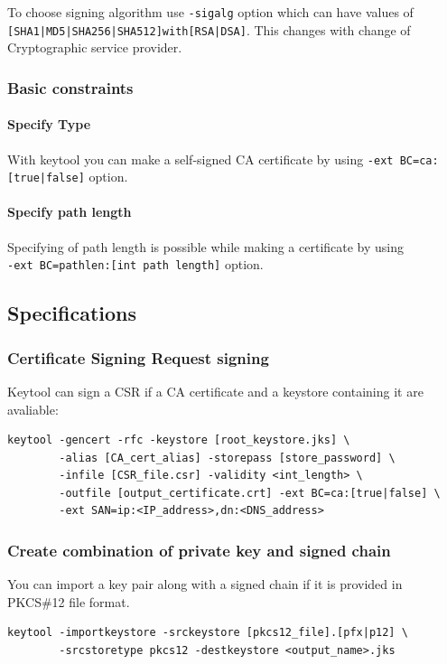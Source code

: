 \documentclass[10pt, a4paper]{report}
\begin{document}
{To choose signing algorithm use \verb+-sigalg+ option which can have values of \verb+[SHA1|MD5|SHA256|SHA512]with[RSA|DSA]+. This changes with change of Cryptographic service provider.
    \subsubsection{Basic constraints}
    
      \paragraph{Specify Type}
With keytool you can make a self-signed CA certificate by using \verb+-ext BC=ca:[true|false]+ option.

      \paragraph{Specify path length}
Specifying of path length is possible while making a certificate by using  \\
\verb+-ext BC=pathlen:[int path length]+ option.

  \subsection{Specifications}
  
    \subsubsection{Certificate Signing Request signing}
Keytool can sign a CSR if a CA certificate and a keystore containing it are avaliable:
\begin{verbatim}
keytool -gencert -rfc -keystore [root_keystore.jks] \
        -alias [CA_cert_alias] -storepass [store_password] \
        -infile [CSR_file.csr] -validity <int_length> \
        -outfile [output_certificate.crt] -ext BC=ca:[true|false] \
        -ext SAN=ip:<IP_address>,dn:<DNS_address> 
\end{verbatim}

    \subsubsection{Create combination of private key and signed chain}
You can import a key pair along with a signed chain if it is provided in PKCS\#12 file format.
\begin{verbatim}
keytool -importkeystore -srckeystore [pkcs12_file].[pfx|p12] \
        -srcstoretype pkcs12 -destkeystore <output_name>.jks
\end{verbatim}

}
\end{document}
